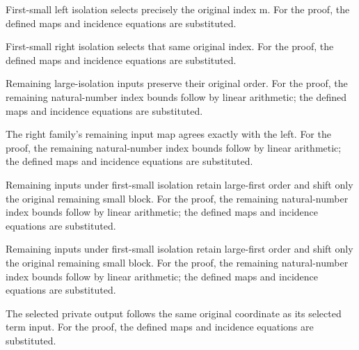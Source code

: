 First-small left isolation selects precisely the original index m.
For the proof, the defined maps and incidence equations are substituted.
\par{}

First-small right isolation selects that same original index.
For the proof, the defined maps and incidence equations are substituted.
\par{}

Remaining large-isolation inputs preserve their original order.
For the proof, the remaining natural-number index bounds follow by linear arithmetic; the defined maps and incidence equations are substituted.
\par{}

The right family's remaining input map agrees exactly with the left.
For the proof, the remaining natural-number index bounds follow by linear arithmetic; the defined maps and incidence equations are substituted.
\par{}

Remaining inputs under first-small isolation retain large-first order and shift only the original remaining small block.
For the proof, the remaining natural-number index bounds follow by linear arithmetic; the defined maps and incidence equations are substituted.
\par{}

Remaining inputs under first-small isolation retain large-first order and shift only the original remaining small block.
For the proof, the remaining natural-number index bounds follow by linear arithmetic; the defined maps and incidence equations are substituted.
\par{}

The selected private output follows the same original coordinate as its selected term input.
For the proof, the defined maps and incidence equations are substituted.
\par{}

